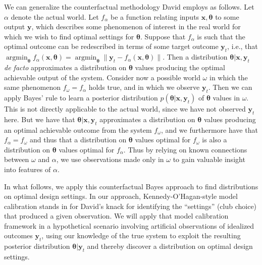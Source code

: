 \documentclass[12pt]{article}
\DeclareMathOperator*{\argmin}{argmin}
\begin{document}
%
We can generalize the counterfactual methodology David employs as follows.
%
Let $\alpha$ denote the actual world. 
%
Let $f_\alpha$ be a function relating inputs $\mathbf x,\boldsymbol \theta$ to some output $\mathbf y$, which describes some phenomenon of interest in the real world for which we wish to find optimal settings for $\boldsymbol\theta$. 
%
Suppose that $f_\alpha$ is such that the optimal outcome can be redescribed in terms of some target outcome $\mathbf y_t$, i.e., that $\argmin_{\boldsymbol\theta} f_\alpha(\mathbf x,\boldsymbol \theta)=\argmin_{\boldsymbol\theta} \lVert \mathbf y_{t} - f_\alpha(\mathbf x,\boldsymbol\theta)\rVert$. 
%
Then a distribution $\boldsymbol\theta|\mathbf x,\mathbf y_{t}$ \textit{de facto} approximates a distribution on $\boldsymbol\theta$ values producing the optimal achievable output of the system. 
%
%
Consider now a possible world $\omega$ in which the same phenomenon $f_\omega=f_\alpha$ holds true, and in which we observe $\mathbf y_{t}$. 
%
Then we can apply Bayes' rule to learn a posterior distribution $p(\boldsymbol\theta|\mathbf x,\mathbf y_{t})$ of $\boldsymbol \theta$ values in $\omega$. 
%
This is not directly applicable to the actual world, since we have not observed $\mathbf y_{t}$ here. 
%
But we have that $\boldsymbol\theta|\mathbf x,\mathbf y_{t}$ approximates a distribution on $\boldsymbol \theta$ values producing an optimal achievable outcome from the system $f_\omega$, and we furthermore have that $f_\alpha=f_\omega$ and thus that a distribution on $\boldsymbol \theta$ values optimal for $f_\omega$ is also a distribution on $\boldsymbol \theta$ values optimal for $f_\alpha$. 
%
Thus by relying on known connections between $\omega$ and $\alpha$, we use observations made only in $\omega$ to gain valuable insight into features of $\alpha$.
%

%
In what follows, we apply this counterfactual Bayes approach to find distributions on optimal design settings.
%
In our approach, Kennedy-O'Hagan-style model calibration \citep{Kennedy2001} stands in for David's knack for identifying the ``settings'' (club choice) that produced a given observation.
%
We will apply that model calibration framework in a hypothetical scenario involving artificial observations of idealized outcomes $\mathbf y_t$, using our knowledge of the true system to exploit the resulting posterior distribution $\boldsymbol\theta|\mathbf y_t$ and thereby discover a distribution on optimal design settings.
%
\end{document}
